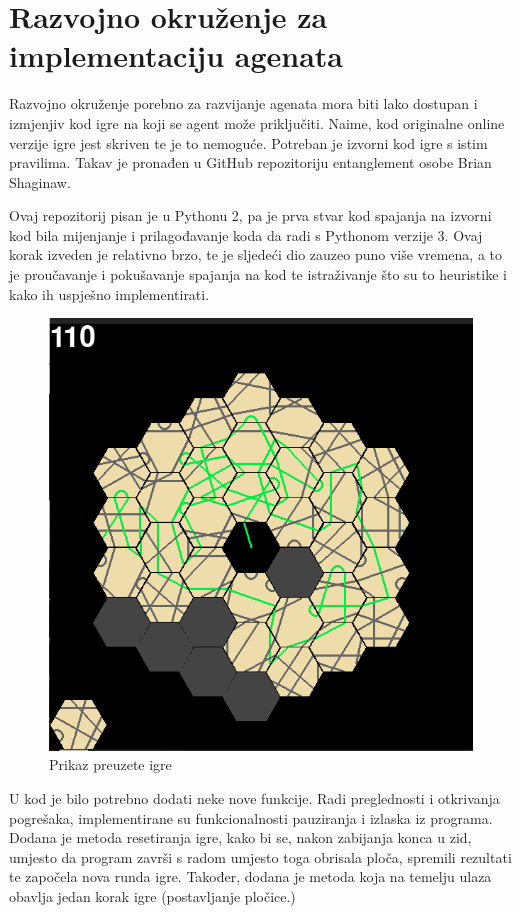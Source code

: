\documentclass[zavrsnirad]{fer}
\begin{document}
\section{Razvojno okruženje za implementaciju agenata}
\label{pog:razvojno_okruzenje}


Razvojno okruženje porebno za razvijanje agenata mora biti lako dostupan i izmjenjiv kod igre na koji se agent može priključiti. Naime, kod originalne online verzije igre jest skriven te je to nemoguće. Potreban je izvorni kod igre s istim pravilima. Takav je pronađen u GitHub repozitoriju \cite{entanglementgithub} entanglement osobe Brian Shaginaw.

Ovaj repozitorij pisan je u Pythonu 2, pa je prva stvar kod spajanja na izvorni kod bila mijenjanje i prilagođavanje koda da radi s Pythonom verzije 3. Ovaj korak izveden je relativno brzo, te je sljedeći dio zauzeo puno više vremena, a to je proučavanje i pokušavanje spajanja na kod te istraživanje što su to heuristike i kako ih uspješno implementirati. 

\begin{figure}[htb]
	\centering
	\includegraphics[width=0.58\linewidth]{Figures/gamefinished.png} 
	\caption{Prikaz preuzete igre}
	\label{slk:game_finished}
\end{figure}

U kod je bilo potrebno dodati neke nove funkcije. Radi preglednosti i otkrivanja pogrešaka, implementirane su funkcionalnosti pauziranja i izlaska iz programa. Dodana je metoda resetiranja igre, kako bi se, nakon zabijanja konca u zid, umjesto da program završi s radom umjesto toga obrisala ploča, spremili rezultati te započela nova runda igre. Također, dodana je metoda koja na temelju ulaza obavlja jedan korak igre (postavljanje pločice.)
\end{document}
